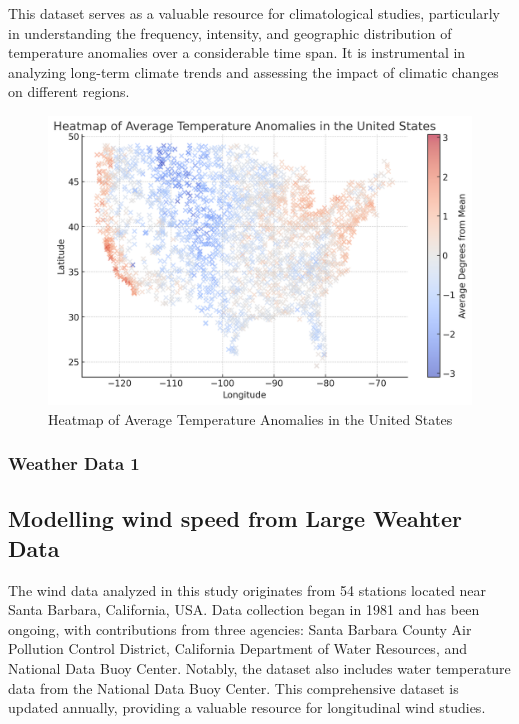 \documentclass[12pt, twoside,hidelinks]{article}
\theoremstyle{definition}
\numberwithin{equation}{section}
\begin{document}
This dataset serves as a valuable resource for climatological studies, particularly in understanding the frequency, intensity, and geographic distribution of temperature anomalies over a considerable time span. It is instrumental in analyzing long-term climate trends and assessing the impact of climatic changes on different regions.

\begin{figure}[H]
    \centering
    \includegraphics[width=\textwidth]{visuals/weather_visuals/Heat_map_USA.png}
    \caption{Heatmap of Average Temperature Anomalies in the United States}
    \label{fig:heatmap_usa}
\end{figure}

\newpage

\subsubsection{Weather Data 1}

\subsection{Modelling wind speed from Large Weahter Data}

The wind data analyzed in this study originates from 54 stations located near Santa Barbara, California, USA. Data collection began in 1981 and has been ongoing, with contributions from three agencies: Santa Barbara County Air Pollution Control District, California Department of Water Resources, and National Data Buoy Center. Notably, the dataset also includes water temperature data from the National Data Buoy Center. This comprehensive dataset is updated annually, providing a valuable resource for longitudinal wind studies.
\end{document}
